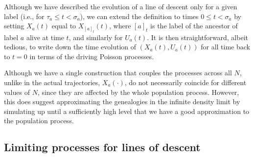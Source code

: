 \documentclass[EJP]{ejpecp} %
\newcommand{\citet}[1]{\cite{#1}}
\begin{document}
Although we have described the evolution of a line of descent only for a given label
(i.e., for $\tau_a \le t < \sigma_a$),
we can extend the definition to times
$0 \le t < \sigma_a$ by setting
$X_a(t)$ equal to $X_{[a]_t}(t)$,
where $[a]_t$ is the label of the ancestor of label $a$ alive at time $t$,
and similarly for $U_a(t)$.
It is then straightforward, albeit tedious,
to write down the time evolution of $(X_a(t), U_a(t))$ for all time back 
to $t=0$
in terms of the driving Poisson processes.

\begin{remark}
Although we have a single construction that couples the processes across all $N$,
unlike in \citet{kurtz/rodrigues:2011} the actual trajectories, $X_a(\cdot)$,
do not necessarily coincide for different values of $N$,
since they are affected by the whole population process.
However, this does suggest approximating the genealogies in the infinite density limit
by simulating up until a sufficiently high level
that we have a good approximation to the population process.
\end{remark}


\subsection{Limiting processes for lines of descent}
\label{sec:limiting_lines_of_descent}
\end{document}
